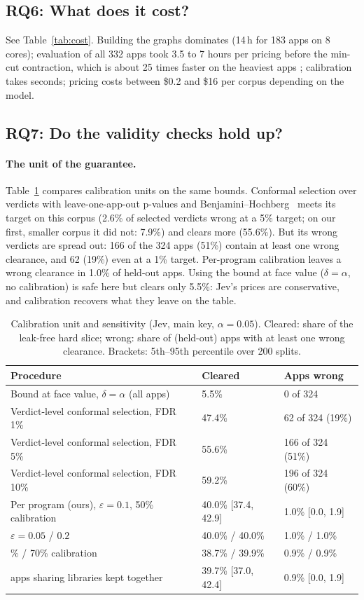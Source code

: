 \subsection{RQ6: What does it cost?}
\label{sec:rq6}
See Table~\ref{tab:cost}.
Building the graphs dominates (14\,h for 183 apps on 8 cores); evaluation of all 332 apps took 3.5 to 7 hours per pricing before the min-cut contraction, which is about 25 times faster on the heaviest apps ; calibration takes seconds; pricing costs between \$0.2 and \$16 per corpus depending on the model.

\subsection{RQ7: Do the validity checks hold up?}
\label{sec:rq7}
\paragraph{The unit of the guarantee.}
Table~\ref{tab:unit} compares calibration units on the same bounds.
Conformal selection over verdicts with leave-one-app-out p-values and Benjamini--Hochberg~\cite{conformalselection} meets its target on this corpus (2.6\% of selected verdicts wrong at a 5\% target; on our first, smaller corpus it did not: 7.9\%) and clears more (55.6\%).
But its wrong verdicts are spread out: 166 of the 324 apps (51\%) contain at least one wrong clearance, and 62 (19\%) even at a 1\% target.
Per-program calibration leaves a wrong clearance in 1.0\% of held-out apps.
Using the bound at face value ($\delta=\alpha$, no calibration) is safe here but clears only 5.5\%: Jev's prices are conservative, and calibration recovers what they leave on the table.
\begin{table}[t]
\caption{Calibration unit and sensitivity (Jev, main key, $\alpha=0.05$). Cleared: share of the leak-free hard slice; wrong: share of (held-out) apps with at least one wrong clearance. Brackets: 5th--95th percentile over 200 splits.}
\label{tab:unit}
\small
\begin{tabular}{@{}lll@{}}
\toprule
Procedure & Cleared & Apps wrong\\
\midrule
Bound at face value, $\delta=\alpha$ (all apps) & 5.5\% & 0 of 324\\
Verdict-level conformal selection, FDR 1\% & 47.4\% & 62 of 324 (19\%)\\
Verdict-level conformal selection, FDR 5\% & 55.6\% & 166 of 324 (51\%)\\
Verdict-level conformal selection, FDR 10\% & 59.2\% & 196 of 324 (60\%)\\
\midrule
Per program (ours), $\varepsilon=0.1$, 50\% calibration & 40.0\% [37.4, 42.9] & 1.0\% [0.0, 1.9]\\
\quad $\varepsilon=0.05$ / $0.2$ & 40.0\% / 40.0\% & 1.0\% / 1.0\%\\
\quad 30\% / 70\% calibration & 38.7\% / 39.9\% & 0.9\% / 0.9\%\\
\quad apps sharing libraries kept together & 39.7\% [37.0, 42.4] & 0.9\% [0.0, 1.9]\\
\bottomrule
\end{tabular}
\end{table}
